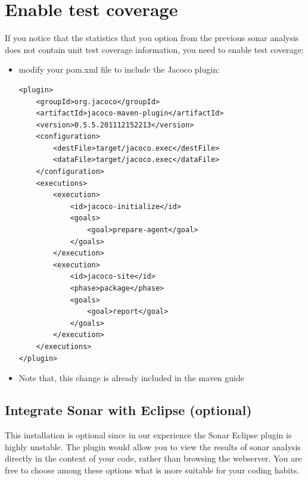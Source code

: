 \documentclass{article}
\newif\ifinstall
\begin{document}
\ifinstall
\else
\section{Enable test coverage}
If you notice that the statistics that you option from the previous
sonar analysis does not contain unit test coverage information, you
need to enable test coverage:

\begin{itemize}
\item modify your pom.xml file to include the Jacoco plugin:
\begin{lstlisting}
<plugin>
	<groupId>org.jacoco</groupId>
	<artifactId>jacoco-maven-plugin</artifactId>
	<version>0.5.5.201112152213</version>
	<configuration>
		<destFile>target/jacoco.exec</destFile>
		<dataFile>target/jacoco.exec</dataFile>
	</configuration>
	<executions>
		<execution>
			<id>jacoco-initialize</id>
			<goals>
				<goal>prepare-agent</goal>
			</goals>
		</execution>
		<execution>
			<id>jacoco-site</id>
			<phase>package</phase>
			<goals>
				<goal>report</goal>
			</goals>
		</execution>
	</executions>
</plugin>
\end{lstlisting}
\item Note that, this change is already included in the maven guide

\end{itemize}

\fi

\subsection{Integrate Sonar with Eclipse (optional)}

This installation is optional since in our experience the Sonar
Eclipse plugin is highly unstable. The plugin would allow you to view
the results of sonar analysis directly in the context of your code,
rather than browsing the webserver. You are free to choose among these
options what is more suitable for your coding habits. 
\end{document}
